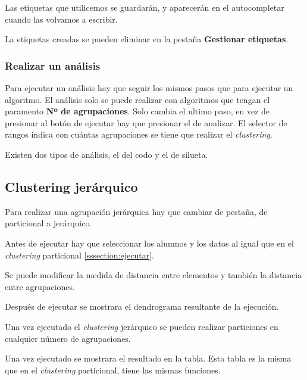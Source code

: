 Las etiquetas que utilicemos se guardarán, y aparecerán en el autocompletar cuando las volvamos a escribir.

La etiquetas creadas se pueden eliminar en la pestaña \textbf{Gestionar etiquetas}.

\subsubsection{Realizar un análisis}
Para ejecutar un análisis hay que seguir los mismos pasos que para ejecutar un algoritmo. El análisis solo se puede realizar con algoritmos que tengan el paramento \textbf{Nº de agrupaciones}. Solo cambia el ultimo paso, en vez de presionar al botón de ejecutar hay que presionar el de analizar. El selector de rangos indica con cuántas agrupaciones se tiene que realizar el \emph{clustering}. 

Existen dos tipos de análisis, el del codo y el de silueta.


\subsection{Clustering jerárquico}
Para realizar una agrupación jerárquica hay que cambiar de pestaña, de particional a jerárquico.

Antes de ejecutar hay que seleccionar los alumnos y los datos al igual que en el \emph{clustering} particional \ref{sssection:ejecutar}.

Se puede modificar la medida de distancia entre elementos y también la distancia entre agrupaciones.

Después de ejecutar se mostrara el dendrograma resultante de la ejecución.

Una vez ejecutado el \emph{clustering} jerárquico se pueden realizar particiones en cualquier número de agrupaciones.

Una vez ejecutado se mostrara el resultado en la tabla. Esta tabla es la misma que en el \emph{clustering} particional, tiene las mismas funciones.

